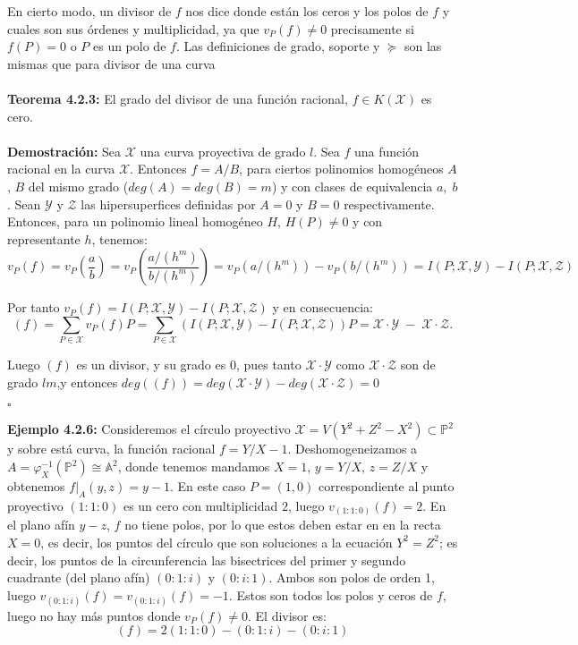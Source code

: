 \documentclass[11pt,spanish]{book}
\newcommand{\qed}{\begin{flushright} $\square$ \end{flushright}}
\begin{document}
En cierto modo, un divisor de $f$ nos dice donde están los ceros y los polos de $f$ y cuales son sus órdenes y multiplicidad, ya que $v_P(f)\neq 0$ precisamente si $f(P)=0$ o $P$ es un polo de $f$. Las definiciones de grado, soporte y $\succeq$ son las mismas que para divisor de una curva\\
\\\hypertarget{teoremaDivisorFuncion}{\textbf{Teorema 4.2.3: }} El grado del divisor de una función racional, $f\in K(\mathbf{\mathcal{X}})$ es cero.\\
\\ \textbf{Demostración: } Sea $\mathbf{\mathcal{X}}$ una curva proyectiva de grado $l$. Sea $f$ una función racional en la curva $\mathbf{\mathcal{X}}$. Entonces $f=A/B$, para ciertos polinomios homogéneos $A$, $B$ del mismo grado ($deg(A)=deg(B)=m$) y con clases de equivalencia $a,\;b$. Sean $\mathbf{\mathcal{Y}}$ y $\mathbf{\mathcal{Z}}$ las hipersuperfices definidas por $A=0$ y $B=0$ respectivamente. Entonces, para un polinomio lineal homogéneo $H$, $H(P)\neq 0$ y con representante $h$, tenemos:
$$v_P(f)=v_P(\frac{a}{b})=v_P(\frac{a/(h^m)}{b/(h^m)})=v_P(a/(h^m))-v_P(b/(h^m))=I(P;\mathbf{\mathcal{X}},\mathbf{\mathcal{Y}})-I(P;\mathbf{\mathcal{X}},\mathbf{\mathcal{Z}})$$

Por tanto $v_P(f)=I(P;\mathbf{\mathcal{X}},\mathbf{\mathcal{Y}})-I(P;\mathbf{\mathcal{X}},\mathbf{\mathcal{Z}})$ y en consecuencia:
$$ (f) =\sum_{P\in \mathbf{\mathcal{X}}} v_P(f)P=\sum_{P\in \mathbf{\mathcal{X}}}(I(P;\mathbf{\mathcal{X}},\mathbf{\mathcal{Y}})-I(P;\mathbf{\mathcal{X}},\mathbf{\mathcal{Z}}))P =  \mathbf{\mathcal{X}}\cdot\mathbf{\mathcal{Y}}\;-\;\mathbf{\mathcal{X}}\cdot\mathbf{\mathcal{Z}}. $$

Luego $(f)$ es un divisor, y su grado es 0, pues tanto $\mathbf{\mathcal{X}}\cdot\mathbf{\mathcal{Y}}$ como $\mathbf{\mathcal{X}}\cdot\mathbf{\mathcal{Z}}$ son de grado $lm$,y entonces $deg((f))=deg(\mathbf{\mathcal{X}}\cdot\mathbf{\mathcal{Y}})-deg(\mathbf{\mathcal{X}}\cdot\mathbf{\mathcal{Z}})=0$
\qed
\textbf{Ejemplo 4.2.6:} 
Consideremos el círculo proyectivo $\mathbf{\mathcal{X}}=V(Y^2+Z^2-X^2)\subset \mathbb{P}^2$ y sobre está curva, la función racional $f=Y/X-1$. Deshomogeneizamos a $A=\varphi_X^{-1}(\mathbb{P}^2)\cong \mathbb{A}^2 $, donde tenemos mandamos $X=1$, $y=Y/X$, $z=Z/X$ y obtenemos $f|_{A}(y,z)=y-1$. En este caso $P=(1,0)$ correspondiente al punto proyectivo $(1:1:0)$ es un cero con multiplicidad $2$, luego $v_{(1:1:0)}(f)=2$. En el plano afín $y-z$, $f$ no tiene polos, por lo que estos deben estar en en la recta $X=0$, es decir, los puntos del círculo que son soluciones a la ecuación $Y^2=Z^2$; es decir, los puntos de la circunferencia las bisectrices del primer y segundo cuadrante (del plano afín) $(0:1:i)$ y $(0:i:1)$. Ambos son polos de orden 1, luego $v_{(0:1:i)}(f)=v_{(0:1:i)}(f)=-1$. Estos son todos los polos y ceros de $f$, luego no hay más puntos donde $v_P(f)\neq 0$. El divisor es:
$$ (f) = 2(1:1:0) - (0:1:i) -(0:i:1)$$
\end{document}
